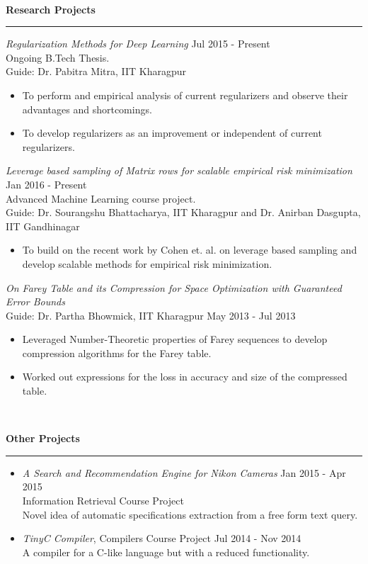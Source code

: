 \documentclass[a4paper,10pt,oneside]{article}
\newcommand{\heading}[1]{
 {\Large \textbf{#1}}
  \vspace{0.4em}
  \hrule
  \vspace{0.4em}
}
\newcommand{\SmallEntryGap}{ \vspace{0.6em} }
\newcommand{\EntryGap}{ ~\\ }
\begin{document}

\EntryGap
\heading{Research Projects}
\SmallEntryGap
\emph{Regularization Methods for Deep Learning} \hfill Jul 2015 - Present\\
Ongoing B.Tech Thesis.\\
Guide: Dr. Pabitra Mitra, IIT Kharagpur
\begin{itemize}[noitemsep, nolistsep]
  \item To perform and empirical analysis of current regularizers and observe their advantages and shortcomings.
  \item To develop regularizers as an improvement or independent of current regularizers.
\end{itemize}

\SmallEntryGap

\emph{Leverage based sampling of Matrix rows for scalable empirical risk minimization} \hfill Jan 2016 - Present \\
Advanced Machine Learning course project.\\
Guide: Dr. Sourangshu Bhattacharya, IIT Kharagpur and Dr. Anirban Dasgupta, IIT Gandhinagar
\begin{itemize}[noitemsep, nolistsep]
 \item To build on the recent work by Cohen et. al. on leverage based sampling and develop scalable methods for empirical risk minimization.
\end{itemize}

\SmallEntryGap

\emph{On Farey Table and its Compression for Space Optimization with Guaranteed Error Bounds} \\
Guide: Dr. Partha Bhowmick, IIT Kharagpur \hfill May 2013 - Jul 2013 \\
\begin{itemize}[noitemsep, nolistsep]
 \item Leveraged Number-Theoretic properties of Farey sequences to develop compression algorithms for the Farey table.
 \item Worked out expressions for the loss in accuracy and size of the compressed table.
\end{itemize}


\EntryGap
\pagebreak
\heading{Other Projects}
\begin{itemize}
  \setlength{\itemsep}{0.0em}
  \item \emph{A Search and Recommendation Engine for Nikon Cameras} \hfill Jan 2015 - Apr 2015\\
  Information Retrieval Course Project\\
  Novel idea of automatic specifications extraction from a free form text query.
  \item \emph{TinyC Compiler}, Compilers Course Project \hfill Jul 2014 - Nov 2014\\
  A compiler for a C-like language but with a reduced functionality.
\end{itemize}
\end{document}
